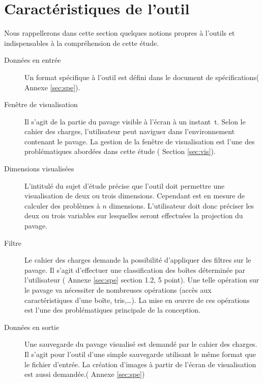 \section{Caractéristiques de l'outil}
Nous rappellerons dans cette section quelques notions propres à l'outils et indispensables à la compréhension de cette étude.  
\begin{description}
\item[Données en entrée] Un format spécifique à l'outil est défini dans le document de spécifications(\cf{} Annexe \ref{sec:spe}).
 \item[Fenêtre de visualisation] Il s'agit de la partie du pavage visible à l'écran à un instant~t. Selon le cahier des charges, l'utilisateur peut \og naviguer\fg{} dans l'environnement contenant le pavage. La gestion de la fenêtre de visualisation est l'une des problématiques abordées dans cette étude (\cf{} Section \ref{sec:vis}).
\item[Dimensions visualisées] L'intitulé du sujet d'étude précise que l'outil doit permettre une visualisation de deux ou trois dimensions. Cependant \realpaver{} est en mesure de calculer des problèmes à $n$ dimensions. L'utilisateur doit donc préciser les deux ou trois variables sur lesquelles seront effectuées la projection du pavage.  
\item[Filtre] Le cahier des charges demande la possibilité d'appliquer des filtres sur le pavage. Il s'agit d'effectuer une classification des boîtes déterminée par l'utilisateur (\cf{} Annexe \ref{sec:spe} section 1.2, 5 point). Une telle opération sur le pavage va nécessiter de nombreuses opérations (accès aux caractéristiques d'une boîte, tris,\dots). La mise en œuvre de ces opérations est l'une des problématiques principale de la conception.    
\item[Données en sortie] Une sauvegarde du pavage visualisé est demandé par le cahier des charges. Il s'agit pour l'outil d'une simple \og sauvegarde \fg{} utilisant le même format que le fichier d'entrée. La création d'images à partir de l'écran de visualisation est aussi demandée.(\cf{} Annexe \ref{sec:spe})
\end{description}
